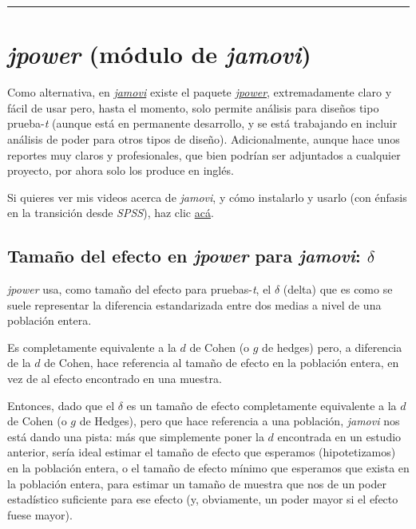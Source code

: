 \documentclass[
]{article}
\begin{document}
\begin{center}\rule{0.5\linewidth}{0.5pt}\end{center}

\hypertarget{jpower-muxf3dulo-de-jamovi}{%
\section{\texorpdfstring{\emph{jpower} (módulo de
\emph{jamovi})}{jpower (módulo de jamovi)}}\label{jpower-muxf3dulo-de-jamovi}}

Como alternativa, en \href{https://www.jamovi.org/}{\emph{jamovi}}
existe el paquete
\href{https://github.com/richarddmorey/jpower}{\emph{jpower}},
extremadamente claro y fácil de usar pero, hasta el momento, solo
permite análisis para diseños tipo prueba-\emph{t} (aunque está en
permanente desarrollo, y se está trabajando en incluir análisis de poder
para otros tipos de diseño). Adicionalmente, aunque hace unos reportes
muy claros y profesionales, que bien podrían ser adjuntados a cualquier
proyecto, por ahora solo los produce en inglés.

Si quieres ver mis videos acerca de \emph{jamovi}, y cómo instalarlo y
usarlo (con énfasis en la transición desde \emph{SPSS}), haz clic
\href{https://www.youtube.com/playlist?list=PLHk7UNt35ccXX4I61PiVMOf9VkijgaJN8}{acá}.

\hypertarget{tamauxf1o-del-efecto-en-jpower-para-jamovi-delta}{%
\subsection{\texorpdfstring{Tamaño del efecto en \emph{jpower} para
\emph{jamovi}:
\(\delta\)}{Tamaño del efecto en jpower para jamovi: \textbackslash delta}}\label{tamauxf1o-del-efecto-en-jpower-para-jamovi-delta}}

\emph{jpower} usa, como tamaño del efecto para pruebas-\emph{t}, el
\(\delta\) (delta) que es como se suele representar la diferencia
estandarizada entre dos medias a nivel de una población entera.

Es completamente equivalente a la \(d\) de Cohen (o \(g\) de hedges)
pero, a diferencia de la \(d\) de Cohen, hace referencia al tamaño de
efecto en la población entera, en vez de al efecto encontrado en una
muestra.

Entonces, dado que el \(\delta\) es un tamaño de efecto completamente
equivalente a la \(d\) de Cohen (o \(g\) de Hedges), pero que hace
referencia a una población, \emph{jamovi} nos está dando una pista: más
que simplemente poner la \(d\) encontrada en un estudio anterior, sería
ideal estimar el tamaño de efecto que esperamos (hipotetizamos) en la
población entera, o el tamaño de efecto mínimo que esperamos que exista
en la población entera, para estimar un tamaño de muestra que nos de un
poder estadístico suficiente para ese efecto (y, obviamente, un poder
mayor si el efecto fuese mayor).
\end{document}
